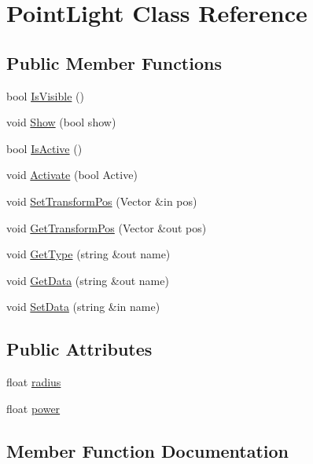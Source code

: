 \hypertarget{class_point_light}{}\section{Point\+Light Class Reference}
\label{class_point_light}
\subsection*{Public Member Functions}
\begin{DoxyCompactItemize}
\item 
bool \hyperlink{class_point_light_ad865095cebf47c5204589e7bb945ae3f}{Is\+Visible} ()
\item 
void \hyperlink{class_point_light_ac32b90aa8e55345d9b9c330c787c9814}{Show} (bool show)
\item 
bool \hyperlink{class_point_light_a059544a6a902cffd4f42c7240da2dd3e}{Is\+Active} ()
\item 
void \hyperlink{class_point_light_aa3b76cb690eb7b007ba5d89d887f9ae0}{Activate} (bool Active)
\item 
void \hyperlink{class_point_light_aeb14dfb0ece8a0b53b9749071b0713b2}{Set\+Transform\+Pos} (Vector \&in pos)
\item 
void \hyperlink{class_point_light_aef2cc3061c95443d01c7ea67f97daceb}{Get\+Transform\+Pos} (Vector \&out pos)
\item 
void \hyperlink{class_point_light_a55bf006faad868b8e25c8b10f94a7d6d}{Get\+Type} (string \&out name)
\item 
void \hyperlink{class_point_light_a045fdfe1cb6a88e2416bd0315d062ff1}{Get\+Data} (string \&out name)
\item 
void \hyperlink{class_point_light_aa7d36cabae373fd963b02c98b6004175}{Set\+Data} (string \&in name)
\end{DoxyCompactItemize}
\subsection*{Public Attributes}
\begin{DoxyCompactItemize}
\item 
float \hyperlink{class_point_light_a49f48fc72be12660d6248c060abc0da6}{radius}
\item 
float \hyperlink{class_point_light_a839f7586ba4f924bc437fd6b3a78eeaf}{power}
\end{DoxyCompactItemize}


\subsection{Member Function Documentation}
\hypertarget{class_point_light_aa3b76cb690eb7b007ba5d89d887f9ae0}{}\label{class_point_light_aa3b76cb690eb7b007ba5d89d887f9ae0} 
